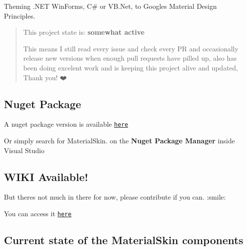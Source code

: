 Theming .N\+ET Win\+Forms, C\# or V\+B.\+Net, to Google\textquotesingle{}s Material Design Principles.

\begin{quote}
This project state is\+: {\bfseries somewhat active}

This means I still read every issue and check every PR and occasionally release new versions when enough pull requests have pilled up, also \href{https://github.com/orapps44}{\tt } has been doing excelent work and is keeping this project alive and updated, Thank you! ❤️ \end{quote}




\subsection*{Nuget Package}

A nuget package version is available \href{https://www.nuget.org/packages/MaterialSkin.2/}{\tt here}

Or simply search for Material\+Skin. on the {\bfseries Nuget Package Manager} inside Visual Studio

\subsection*{W\+I\+KI Available!}

But there\textquotesingle{}s not much in there for now, please contribute if you can. \+:smile\+:

You can access it \href{https://github.com/leocb/MaterialSkin/wiki}{\tt here}

\subsection*{Current state of the Material\+Skin components}

